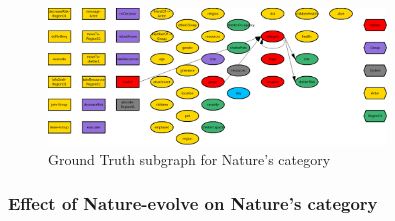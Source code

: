 \documentclass{article}%
\begin{document}
\begin{figure}[ht]%
\centering%
\includegraphics[width=0.8\textwidth]{images/categoryOfNature.png}%
\caption{Ground Truth subgraph for Nature's category}%
\end{figure}

%
\subsubsection{Effect of Nature{-}evolve on Nature's category}%
\label{ssubsec:Effect of Nature{-}evolve on Nature's category}%
\end{document}
